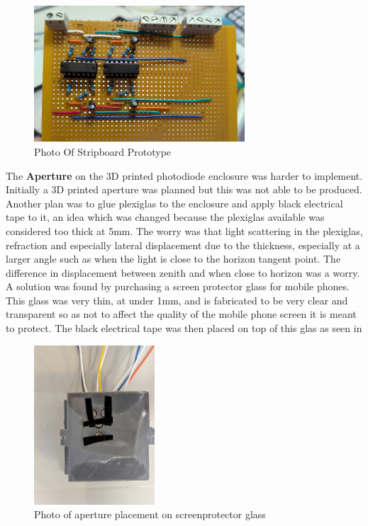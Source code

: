\begin{figure}[htbp] %
  \centering
  \includegraphics[width=0.7\textwidth]{chapters/methodology/prototype/StripboardPhoto.jpg}
  \caption{Photo Of Stripboard Prototype}
  \label{fig:StripboardPhoto}
\end{figure}
\vspace{1em}

\noindent The {\bfseries Aperture} on the 3D printed photodiode enclosure was harder to implement. Initially a 3D printed aperture was planned but this was not able to be produced. Another plan was to glue plexiglas to the enclosure and apply black electrical tape to it, an idea which was changed because the plexiglas available was considered too thick at 5mm. The worry was that light scattering in the plexiglas, refraction and especially lateral displacement due to the thickness,  especially at a larger angle such as when the light is close to the horizon tangent point. The difference in displacement between zenith and when close to horizon was a worry. A solution was found by purchasing a screen protector glass for mobile phones. This glass was very thin, at under 1mm, and is fabricated to be very clear and transparent so as not to affect the quality of the mobile phone screen it is meant to protect.
The black electrical tape was then placed on top of this glas as seen in 
%
\begin{figure}[htbp] %
  \centering
  \includegraphics[width=0.4\textwidth]{chapters/methodology/prototype/aperture_photo.jpg}
  \caption{Photo of aperture placement on screenprotector glass}
  \label{fig:StripboardPhoto}
\end{figure}

